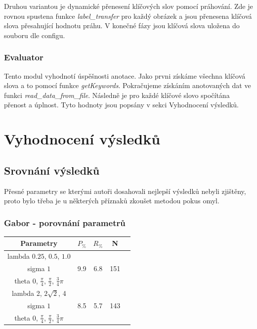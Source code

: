 \documentclass[czech,BP]{thesiskiv}
\begin{document}
\par Druhou variantou je dynamické přenesení klíčových slov pomocí práhování. Zde je rovnou spustena funkce \textit{label\_transfer} pro každý obrázek a jsou přenesena klíčová slova přesahující hodnotu práhu. V konečné fázy jsou klíčová slova uložena do souboru dle configu. 
  

\subsection{Evaluator}
\par Tento modul vyhodnotí úspěšnosti anotace. Jako prvni získáme všechna klíčová slova a to pomocí funkce \textit{getKeywords}. Pokračujeme získáním anotovaných dat ve funkci \textit{read\_data\_from\_file}.  Následně je pro každé klíčové slovo spočítána přenost a úplnost. Tyto hodnoty jsou popsány v sekci Vyhodnocení výsledků.

\chapter{Vyhodnocení výsledků}

\section{Srovnání výsledků}
Přesné parametry se kterými autoři dosahovali nejlepší výsledků nebyli zjištěny, proto bylo třeba je u některých příznaků zkoušet metodou pokus omyl.


\subsection{Gabor - porovnání parametrů}
\begin{center}
\begin{tabular}{ |c|c|c|c|c| }
\hline
Parametry & $P_{\%}$ & $R_{\%}$ & N \\ \hline
 lambda $0.25$, $0.5$, $1.0$ & \multirow{3}{*}{9.9} & \multirow{3}{*}{6.8} & \multirow{3}{*}{151} \\
 sigma $1$ & & & \\
 theta $0$, $\frac{\pi}{4}$, $\frac{\pi}{2}$, $\frac{3}{4}\pi$ & & & \\ \hline
 lambda 2, $2\sqrt{2}$, 4 & \multirow{3}{*}{8.5} & \multirow{3}{*}{5.7} & \multirow{3}{*}{143} \\
 sigma $1$ & & & \\
 theta $0$, $\frac{\pi}{4}$, $\frac{\pi}{2}$, $\frac{3}{4}\pi$ & & & \\ 
\hline
\end{tabular}
\end{center}
\end{document}
